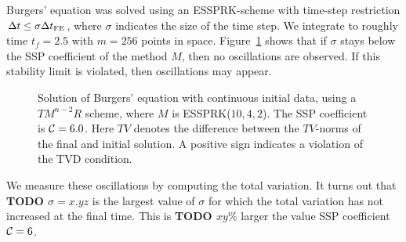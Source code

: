 Burgers' equation was solved using an ESSPRK-scheme with time-step 
restriction $\Delta t \leq \sigma{\Delta t}_{\text{FE}}$, where $\sigma$ indicates the size 
of the time step. 
We integrate to roughly time $t_{f} = 2.5$
with $m = 256$ points in space.
Figure~\ref{fig:burgers_cont} shows that if $\sigma$ stays below the SSP 
coefficient of the method $M$, then no oscillations are observed. 
If this stability limit is violated, then oscillations may appear.
\begin{figure}
    \centering
    \quad
    \caption{Solution of Burgers' equation with continuous initial data, using a 
    $TM^{n-2}R$ scheme, where $ M $ is ESSPRK($10,4,2$). 
    The SSP coefficient is $\mathcal{C} = 6.0$. 
    Here $TV$ denotes the difference between the $TV$-norms of the final and 
    initial solution.
    A positive sign indicates a violation of the TVD condition.}
    \label{fig:burgers_cont}
\end{figure}
We measure these oscillations by computing the total variation.
It turns out that \textbf{\red TODO $\sigma = x.yz$}
is the largest value of $\sigma$ for which the total variation has not
increased at the final time.
This is \textbf{\red TODO $xy\%$} larger the value SSP coefficient
$\mathcal{C} = 6$.


